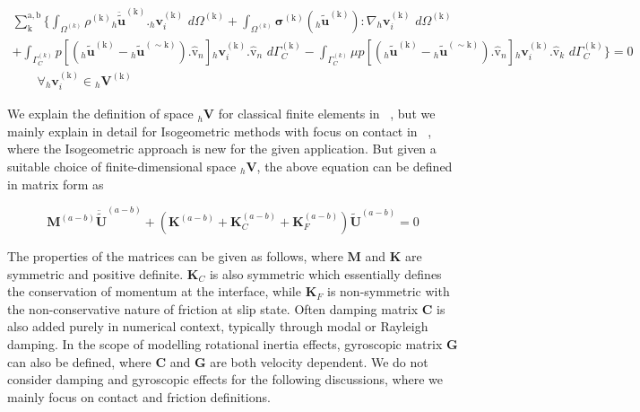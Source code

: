 \begin{multline} \label{weak_pert_2}
\sum^{\mathrm{a,b}}_{\mathrm{k}}   \bigg\{ \int_{\Omega^{(k)}}\rho^\mathrm{(k)} {}_h\bm{\ddot{\widetilde{u}}}^\mathrm{(k)}. {}_h \bm v_i^\mathrm{(k)}  \,\,d \Omega^{(\mathrm k)} +\int_{\Omega^{(k)}} \bm{\sigma}^\mathrm{(k)}({}_h \bm{\widetilde u}^\mathrm{(k)}) : \nabla {}_h \bm v_i^\mathrm{(k)} \,\,d \Omega^{(\mathrm k)}\\  
+\int_{\Gamma^{(k)}_C}  \mathit{p}[({{}_h\widetilde{\bm u}}^{(\mathrm k)} - {{}_h \widetilde{\bm u}}^{ (\sim \mathrm k)}). \bm{\hat{\mathrm v}}_n]  {}_h \bm v_i^\mathrm{(k)}. \bm{\hat{\mathrm v}}_n \,\,d{\Gamma^{(\mathrm k)}_C}
-\int_{\Gamma^{(k)}_C}  \mu \mathit{p}[({{}_h\widetilde{\bm u}}^{(\mathrm k)} - {{}_h\widetilde{\bm u}}^{(\sim \mathrm k)}). \bm{\hat{\mathrm v}}_n]  {}_h \bm v_i^\mathrm{(k)}. \bm{\hat{\mathrm v}}_k \,\,d{\Gamma^{(\mathrm k)}_C} \bigg\} = 0 \\
\qquad \forall {}_h \bm v_i^{(\mathrm k)} \in {}_h \bm V^{(\mathrm k)}
\end{multline} 

We explain the definition of space ${}_h \bm V$ for classical finite elements in ~, but we mainly explain in detail for Isogeometric methods with focus on contact in ~, where the Isogeometric approach is new for the given application. 
But given a suitable choice of finite-dimensional space ${}_h \bm V$, the above equation can be defined in matrix form as  

\begin{equation}\label{mat_dyn_fric}
\mathbf M^{(a-b)} \ddot{\bm{\widetilde U}}^{(a-b)} +(\mathbf K^{(a-b)} +\mathbf K_C^{(a-b)}+\mathbf K_F^{(a-b)}) \bm{\widetilde{U}}^{(a-b)} =0
\end{equation}

The properties of the matrices can be given as follows, where $\mathbf M$ and $\mathbf K$ are symmetric and positive definite. $\mathbf K_C$ is also symmetric which essentially defines the conservation of momentum at the interface, while $\mathbf K_F$ is non-symmetric with the non-conservative nature of friction at slip state. 
Often damping matrix $\mathbf C$ is also added purely in numerical context, typically through modal or Rayleigh damping. In the scope of modelling rotational inertia effects, gyroscopic matrix $\mathbf G$ can also be defined, where $\mathbf {C}$ and  $\mathbf {G}$ are both velocity dependent. We do not consider damping and gyroscopic effects for the following discussions, where we mainly focus on contact and friction definitions.\\

